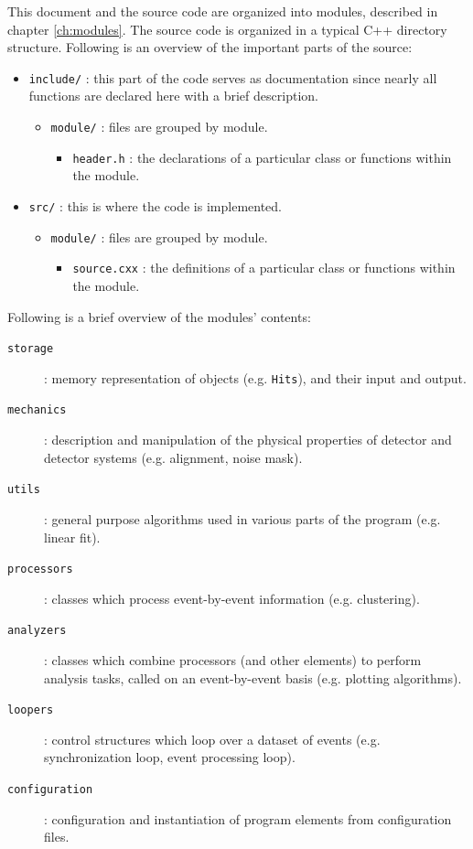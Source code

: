 \documentclass[10pt,a4paper]{book}
\begin{document}
This document and the source code are organized into modules, described in chapter \ref{ch:modules}. The source code is organized in a typical C++ directory structure. Following is an overview of the important parts of the source:

\begin{itemize}
	\item \Verb`include/` : this part of the code serves as documentation since nearly all functions are declared here with a brief description.
	\begin{itemize}
		\item \Verb`module/` : files are grouped by module.
		\begin{itemize}
			\item \Verb`header.h` : the declarations of a particular class or functions within the module.
		\end{itemize}
	\end{itemize}
	\item \Verb`src/` : this is where the code is implemented.
	\begin{itemize}
		\item \Verb`module/` : files are grouped by module.
		\begin{itemize}
			\item \Verb`source.cxx` : the definitions of a particular class or functions within the module.
		\end{itemize}
	\end{itemize}
\end{itemize}

Following is a brief overview of the modules' contents:

\begin{description}
	\item[\Verb`storage`]: memory representation of objects (e.g. \Verb`Hits`), and their input and output.
	\item[\Verb`mechanics`]: description and manipulation of the physical properties of detector and detector systems (e.g. alignment, noise mask).
	\item[\Verb`utils`]: general purpose algorithms used in various parts of the program (e.g. linear fit).
	\item[\Verb`processors`]: classes which process event-by-event information (e.g. clustering).
	\item[\Verb`analyzers`]: classes which combine processors (and other elements) to perform analysis tasks, called on an event-by-event basis (e.g. plotting algorithms).
	\item[\Verb`loopers`]: control structures which loop over a dataset of events (e.g. synchronization loop, event processing loop).
	\item[\Verb`configuration`]: configuration and instantiation of program elements from configuration files.
\end{description}
\end{document}
